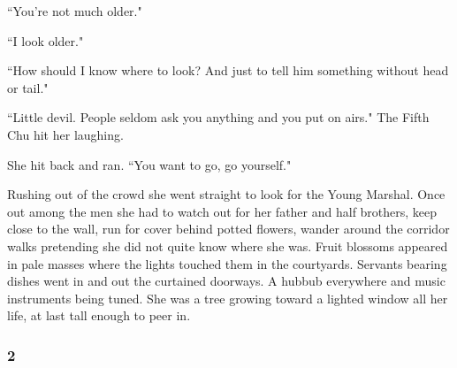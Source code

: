 \par ``You're not much older."
\par ``I look older."
\par ``How should I know where to look? And just to tell him something without head or tail."
\par ``Little devil. People seldom ask you anything and you put on airs." The Fifth Chu hit her laughing.
\par She hit back and ran. ``You want to go, go yourself."
\par Rushing out of the crowd she went straight to look for the Young Marshal. Once out among the men she had to watch out for her father and half brothers, keep close to the wall, run for cover behind potted flowers, wander around the corridor walks pretending she did not quite know where she was. Fruit blossoms appeared in pale masses where the lights touched them in the courtyards. Servants bearing dishes went in and out the curtained doorways. A hubbub everywhere and music instruments being tuned. She was a tree growing toward a lighted window all her life, at last tall enough to peer in.






\subsubsection*{2}

